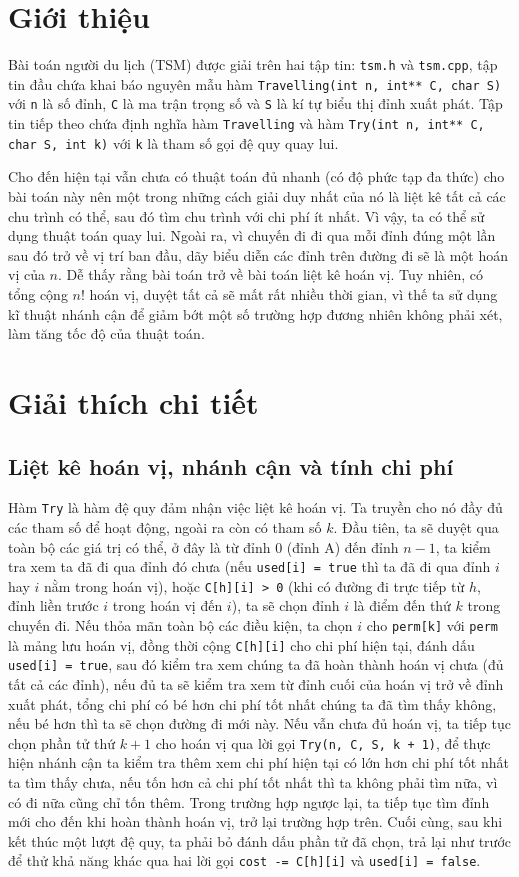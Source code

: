 \section{Giới thiệu}
Bài toán người du lịch (TSM) được giải trên hai tập tin: \texttt{tsm.h} và \texttt{tsm.cpp}, tập tin đầu chứa khai báo nguyên mẫu hàm \texttt{Travelling(int n, int** C, char S)} với \texttt{n} là số đỉnh, \texttt{C} là ma trận trọng số và \texttt{S} là kí tự biểu thị đỉnh xuất phát. Tập tin tiếp theo chứa định nghĩa hàm \texttt{Travelling} và hàm \texttt{Try(int n, int** C, char S, int k)} với \texttt{k} là tham số gọi đệ quy quay lui.

Cho đến hiện tại vẫn chưa có thuật toán đủ nhanh (có độ phức tạp đa thức) cho bài toán này nên một trong những cách giải duy nhất của nó là liệt kê tất cả các chu trình có thể, sau đó tìm chu trình với chi phí ít nhất. Vì vậy, ta có thể sử dụng thuật toán quay lui. Ngoài ra, vì chuyến đi đi qua mỗi đỉnh đúng một lần sau đó trở về vị trí ban đầu, dãy biểu diễn các đỉnh trên đường đi sẽ là một hoán vị của $n$. Dễ thấy rằng bài toán trở về bài toán liệt kê hoán vị. Tuy nhiên, có tổng cộng $n!$ hoán vị, duyệt tất cả sẽ mất rất nhiều thời gian, vì thế ta sử dụng kĩ thuật nhánh cận để giảm bớt một số trường hợp đương nhiên không phải xét, làm tăng tốc độ của thuật toán.
\section{Giải thích chi tiết}
\subsection{Liệt kê hoán vị, nhánh cận và tính chi phí}
Hàm \texttt{Try} là hàm đệ quy đảm nhận việc liệt kê hoán vị. Ta truyền cho nó đầy đủ các tham số để hoạt động, ngoài ra còn có tham số $k$. Đầu tiên, ta sẽ duyệt qua toàn bộ các giá trị có thể, ở đây là từ đỉnh 0 (đỉnh A) đến đỉnh $n-1$, ta kiểm tra xem ta đã đi qua đỉnh đó chưa (nếu \texttt{used[i] = true} thì ta đã đi qua đỉnh $i$ hay $i$ nằm trong hoán vị), hoặc \texttt{C[h][i] > 0} (khi có đường đi trực tiếp từ $h$, đỉnh liền trước $i$ trong hoán vị đến $i$), ta sẽ chọn đỉnh $i$ là điểm đến thứ $k$ trong chuyến đi. Nếu thỏa mãn toàn bộ các điều kiện, ta chọn $i$ cho \texttt{perm[k]} với \texttt{perm} là mảng lưu hoán vị, đồng thời cộng \texttt{C[h][i]} cho chi phí hiện tại, đánh dấu \texttt{used[i] = true}, sau đó kiểm tra xem chúng ta đã hoàn thành hoán vị chưa (đủ tất cả các đỉnh), nếu đủ ta sẽ kiểm tra xem từ đỉnh cuối của hoán vị trở về đỉnh xuất phát, tổng chi phí có bé hơn chi phí tốt nhất chúng ta đã tìm thấy không, nếu bé hơn thì ta sẽ chọn đường đi mới này. Nếu vẫn chưa đủ hoán vị, ta tiếp tục chọn phần tử thứ $k+1$ cho hoán vị qua lời gọi \texttt{Try(n, C, S, k + 1)}, để thực hiện nhánh cận ta kiểm tra thêm xem chi phí hiện tại có lớn hơn chi phí tốt nhất ta tìm thấy chưa, nếu tốn hơn cả chi phí tốt nhất thì ta không phải tìm nữa, vì có đi nữa cũng chỉ tốn thêm. Trong trường hợp ngược lại, ta tiếp tục tìm đỉnh mới cho đến khi hoàn thành hoán vị, trở lại trường hợp trên. Cuối cùng, sau khi kết thúc một lượt đệ quy, ta phải bỏ đánh dấu phần tử đã chọn, trả lại như trước để thử khả năng khác qua hai lời gọi \texttt{cost -= C[h][i]} và \texttt{used[i] = false}.
